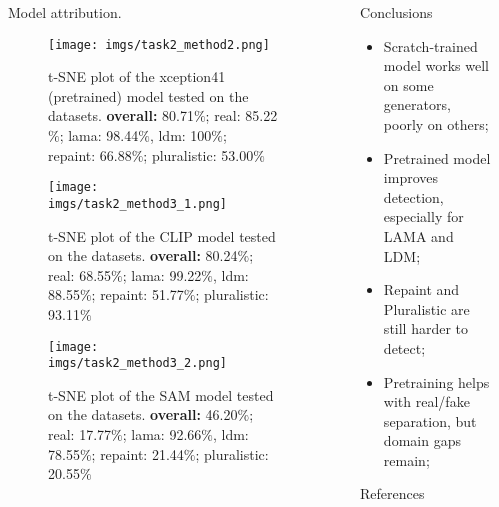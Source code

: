 \documentclass[final]{beamer}
\newlength{\sepwidth}
\newlength{\colwidth}
\newcommand{\separatorcolumn}{\begin{column}{\sepwidth}\end{column}}
\begin{document}
\begin{frame}[t]
\begin{columns}[t]
\begin{column}{\colwidth}
\begin{block}{Model attribution.}
\begin{figure}
      \centering
      \texttt{[image: imgs/task2\_method2.png]}
      \caption{t-SNE plot of the xception41 (pretrained) model tested on the datasets.
      \textbf{overall:} 80.71$\%$; real: 85.22$\%$; lama: 98.44$\%$, ldm: 100$\%$; repaint: 66.88$\%$; pluralistic: 53.00$\%$}
    \end{figure}
    \begin{figure}
      \centering
      \texttt{[image: imgs/task2\_method3\_1.png]}
      \caption{t-SNE plot of the CLIP model tested on the datasets.
      \textbf{overall:} 80.24$\%$; real: 68.55$\%$; lama: 99.22$\%$, ldm: 88.55$\%$; repaint: 51.77$\%$; pluralistic: 93.11$\%$}
    \end{figure}
    \begin{figure}
      \centering
      \texttt{[image: imgs/task2\_method3\_2.png]}
      \caption{t-SNE plot of the SAM model tested on the datasets.
      \textbf{overall:}  46.20$\%$; real: 17.77$\%$; lama: 92.66$\%$, ldm: 78.55$\%$; repaint: 21.44$\%$; pluralistic: 20.55$\%$}
    \end{figure}
  \end{block}
\end{column}
\separatorcolumn
\begin{column}{\colwidth}

  \begin{alertblock}{Conclusions}
    \begin{itemize}
    \item Scratch-trained model works well on some generators, poorly on others;
    \item Pretrained model improves detection, especially for LAMA and LDM;
    \item Repaint and Pluralistic are still harder to detect;
    \item Pretraining helps with real/fake separation, but domain gaps remain;
    \end{itemize}
  \end{alertblock}
  \begin{block}{References}
    \footnotesize
    \nocite{*}
    \printbibliography
  \end{block}

\end{column}

\separatorcolumn
\end{columns}
\end{frame}
\end{document}
